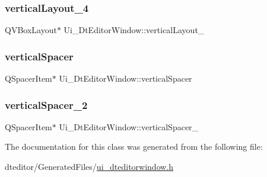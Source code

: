 \subsubsection{\texorpdfstring{verticalLayout\_4}{verticalLayout\_4}}
{\footnotesize\ttfamily Q\+V\+Box\+Layout$\ast$ Ui\+\_\+\+Dt\+Editor\+Window\+::vertical\+Layout\+\_}

\mbox{\label{class_ui___dt_editor_window_a488b70e5e6388eeb23fa5e32180f0429}} 
\subsubsection{\texorpdfstring{verticalSpacer}{verticalSpacer}}
{\footnotesize\ttfamily Q\+Spacer\+Item$\ast$ Ui\+\_\+\+Dt\+Editor\+Window\+::vertical\+Spacer}

\mbox{\label{class_ui___dt_editor_window_ade65903d5f65f0ca5e522b2d15c6cdcc}} 
\subsubsection{\texorpdfstring{verticalSpacer\_2}{verticalSpacer\_2}}
{\footnotesize\ttfamily Q\+Spacer\+Item$\ast$ Ui\+\_\+\+Dt\+Editor\+Window\+::vertical\+Spacer\+\_}



The documentation for this class was generated from the following file\+:\begin{DoxyCompactItemize}
\item 
dteditor/\+Generated\+Files/\mbox{\hyperlink{ui__dteditorwindow_8h}{ui\+\_\+dteditorwindow.\+h}}\end{DoxyCompactItemize}
